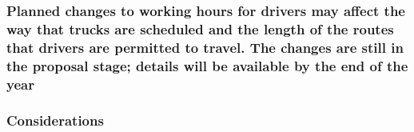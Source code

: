\documentclass[
]{article}
\begin{document}
\hypertarget{planned-changes-to-working-hours-for-drivers-may-affect-the-way-that-trucks-are-scheduled-and-the-length-of-the-routes-that-drivers-are-permitted-to-travel.-the-changes-are-still-in-the-proposal-stage-details-will-be-available-by-the-end-of-the-year}{%
\subsubsection{Planned changes to working hours for drivers may affect
the way that trucks are scheduled and the length of the routes that
drivers are permitted to travel. The changes are still in the proposal
stage; details will be available by the end of the
year}\label{planned-changes-to-working-hours-for-drivers-may-affect-the-way-that-trucks-are-scheduled-and-the-length-of-the-routes-that-drivers-are-permitted-to-travel.-the-changes-are-still-in-the-proposal-stage-details-will-be-available-by-the-end-of-the-year}}

\hypertarget{considerations-44}{%
\subsubsection{Considerations}\label{considerations-44}}
\end{document}

